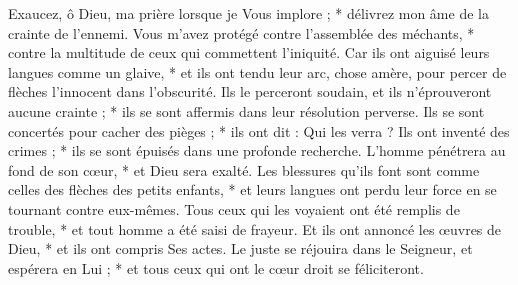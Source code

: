  Exaucez, ô Dieu, ma prière lorsque je Vous implore ; * délivrez mon âme de la crainte de l'ennemi.
\versseparator
 Vous m'avez protégé contre l'assemblée des méchants, * contre la multitude de ceux qui commettent l'iniquité.
\versseparator
 Car ils ont aiguisé leurs langues comme un glaive, * et ils ont tendu leur arc, chose amère, pour percer de flèches l'innocent dans l'obscurité.
\versseparator
 Ils le perceront soudain, et ils n'éprouveront aucune crainte ; * ils se sont affermis dans leur résolution perverse.
\versseparator
 Ils se sont concertés pour cacher des pièges ; * ils ont dit : Qui les verra ?
\versseparator
 Ils ont inventé des crimes ; * ils se sont épuisés dans une profonde recherche.
\versseparator
 L'homme pénétrera au fond de son cœur, * et Dieu sera exalté.
\versseparator
 Les blessures qu'ils font sont comme celles des flèches des petits enfants, * et leurs langues ont perdu leur force en se tournant contre eux-mêmes.
\versseparator
 Tous ceux qui les voyaient ont été remplis de trouble, * et tout homme a été saisi de frayeur.
\versseparator
 Et ils ont annoncé les œuvres de Dieu, * et ils ont compris Ses actes.
\versseparator
 Le juste se réjouira dans le Seigneur, et espérera en Lui ; * et tous ceux qui ont le cœur droit se féliciteront.